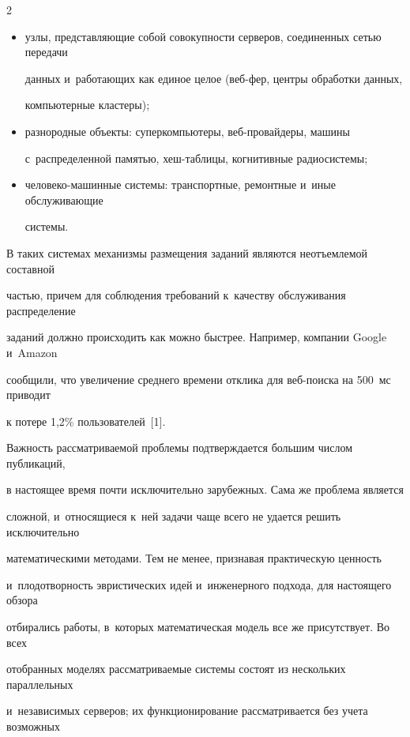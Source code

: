 \begin{multicols}{2}
\begin{itemize}
\item узлы, представляющие собой совокупности серверов, соединенных сетью передачи 


данных и~работающих как единое целое (веб-фер\-, цент\-ры обработки данных, 


компьютерные кластеры);


\item разнородные объекты: суперкомпьютеры, веб-про\-вай\-де\-ры, машины 


с~распределенной па\-мятью, хеш-таб\-ли\-цы, когнитивные ра\-дио\-сис\-темы;


\item человеко-машинные системы: транспортные, ремонтные и~иные обслуживающие 


системы.


\end{itemize}





    В таких системах механизмы размещения заданий являются неотъемлемой составной 


частью, причем для соблюдения требований к~качеству обслуживания распределение 


заданий должно происходить как можно быстрее. Например, компании Google и~Amazon 


сообщили, что увеличение среднего времени отклика для веб-поиска на 500~мс приводит 


к потере 1,2\% пользователей~[1].


     


    Важность рассматриваемой проблемы подтверждается большим числом публикаций, 


в настоящее время почти исключительно зарубежных. Сама же проблема является 


сложной, и~относящиеся к~ней задачи чаще всего не удается решить исключительно 


математическими методами. Тем не менее, признавая практическую ценность 


и~плодотворность эвристических идей и~инженерного подхода, для настоящего обзора 


отбирались работы, в~которых математическая модель все же присутствует. Во всех 


отобранных моделях рассматриваемые системы состоят из нескольких параллельных 


и~независимых серверов; их функционирование рассматривается без учета возможных 



\end{multicols}
